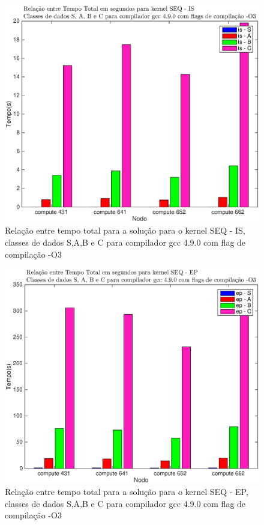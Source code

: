 \documentclass[conference,compsoc]{IEEEtran}
\begin{document}
\begin{figure}[H]
\centering
\includegraphics[width=1.1\columnwidth]{EPS/SEQ/TEMPO_seq-is.eps}
\caption{Relação entre tempo total para a solução para o kernel SEQ - IS, classes de dados S,A,B e C para  compilador gcc 4.9.0 com flag de compilação -O3}
\label{tempo_seq_is_c}
\end{figure}

\begin{figure}[H]
\centering
\includegraphics[width=1.1\columnwidth]{EPS/SEQ/TEMPO_seq-ep.eps}
\caption{Relação entre tempo total para a solução para o kernel SEQ - EP, classes de dados S,A,B e C para  compilador gcc 4.9.0 com flag de compilação -O3}
\label{tempo_seq_ep_c}
\end{figure}
\end{document}
